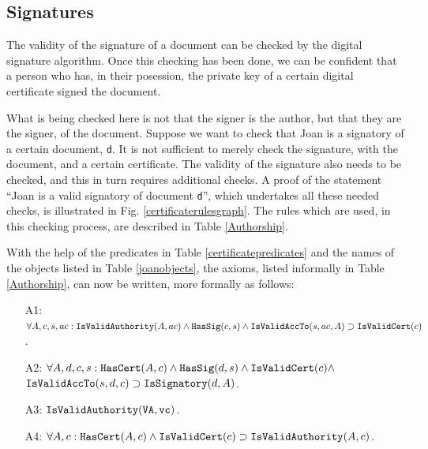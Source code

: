 \subsection{Signatures}
The validity of the signature of
a document can be checked by the digital signature algorithm.
Once this checking has been done, we can be confident that a person
who has, in their posession, the private key of a certain digital certificate
signed the document. 

What is being checked here is not that the signer is the author, but that they 
are the signer, of the document. Suppose we want to check that Joan is a signatory
of a certain document, {\tt d}. It is not sufficient to merely check the signature,
with the document, and a certain certificate. The validity of the signature also needs
to be checked, and this in turn requires additional checks.
A proof of the statement ``Joan is a valid signatory of document {\tt d}'', which undertakes
all these needed checks, is illustrated in Fig. \ref{certificaterulesgraph}. 
The rules which are used, in this checking process, are described in Table \ref{Authorship}.

With the help of the predicates in Table \ref{certificatepredicates} and the names
of the objects listed in Table \ref{joanobjects}, the 
axioms, listed informally in Table \ref{Authorship}, can now be written, more formally as follows:
\begin{itemize}
		\item[A1:]\label{A1a} 
$\forall A, c, s, ac:\hbox{\tt IsValidAuthority}(A,ac) \wedge \hbox{\tt HasSig}(c,s) \\
	\wedge \hbox{\tt IsValidAccTo}(s,ac,A) \supset \hbox{\tt IsValidCert}(c)$.
	\item[A2:] $\forall A, d, c, s: \hbox{\tt HasCert}(A,c) \wedge \hbox{\tt HasSig}(d,s) \\
	\wedge \hbox{\tt IsValidCert}(c) \wedge$\\
${\tt IsValidAccTo}(s,d,c) \supset \hbox{\tt IsSignatory}(d,A)$.
	\item[A3:] $\hbox{\tt IsValidAuthority}(\hbox{\tt VA},{\tt vc})$.
	\item[A4:] $\forall A, c:\hbox{\tt HasCert}(A,c) \wedge \hbox{\tt IsValidCert}(c) \supset \hbox{\tt IsValidAuthority}(A,c)$.
\end{itemize}


